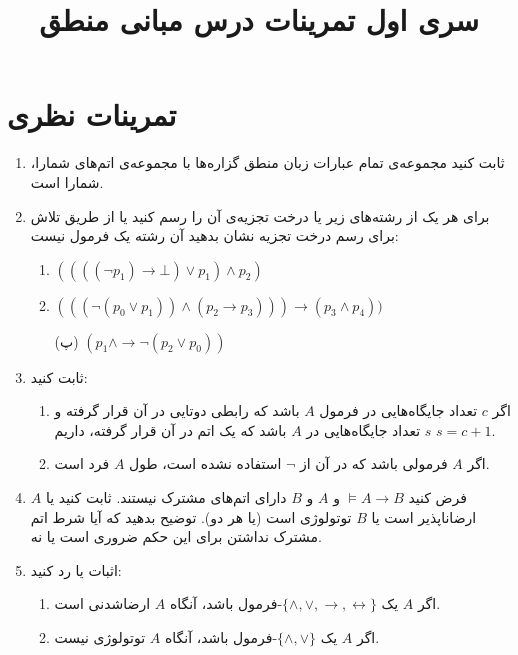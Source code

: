 \documentclass[12pt, 14paper]{article}
\title{سری اول تمرینات درس مبانی منطق}
\author{}
\date{}
\begin{document}
\maketitle

\section{تمرینات نظری}

\begin{enumerate}

\item
ثابت کنید مجموعه‌ی تمام عبارات زبان منطق گزاره‌ها با مجموعه‌ی اتم‌های شمارا، شمارا است.

\item
برای هر یک از رشته‌های زیر یا درخت تجزیه‌ی آن را رسم کنید یا از طریق تلاش برای رسم درخت تجزیه نشان بدهید آن رشته یک فرمول نیست:
\begin{enumerate}
\item $((((\neg p_1)\rightarrow\bot)\vee p_1)\wedge p_2)$
\item $(((\neg (p_0\vee p_1))\wedge(p_2\rightarrow p_3)))\rightarrow (p_3\wedge p_4))$
\item[(پ)] $(p_1\wedge\rightarrow\neg(p_2\vee p_0))$
\end{enumerate}

\item
ثابت کنید:
\begin{enumerate}
\item
اگر $c$ تعداد جایگاه‌هایی در فرمول $A$ باشد که رابطی دوتایی در آن قرار گرفته و $s$ تعداد جایگاه‌هایی در $A$ باشد که یک اتم در آن قرار گرفته، داریم $s=c+1$.
\item
اگر $A$ فرمولی باشد که در آن از $\neg$ استفاده نشده است، طول $A$ فرد است.
\end{enumerate}

\item
فرض کنید $\models A\rightarrow B$ و $A$ و $B$ دارای اتم‌های مشترک نیستند. ثابت کنید یا $A$ ارضاناپذیر است یا $B$ توتولوژی است (یا هر دو). توضیح بدهید که آیا شرط اتم مشترک نداشتن برای این حکم ضروری است یا نه.

\pagebreak

\item
اثبات یا رد کنید:

\begin{enumerate}
\item
اگر $A$ یک $\{\wedge,\vee,\rightarrow,\leftrightarrow\}$-فرمول باشد، آنگاه $A$ ارضاشدنی است.
\item
اگر $A$ یک $\{\wedge,\vee\}$-فرمول باشد، آنگاه $A$ توتولوژی نیست.
\end{enumerate}


\end{enumerate}
\end{document}
